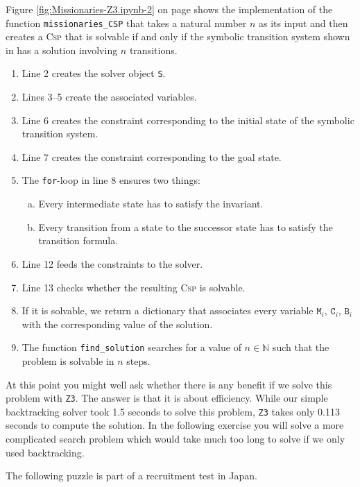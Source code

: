 Figure \ref{fig:Missionaries-Z3.ipynb-2} on page \pageref{fig:Missionaries-Z3.ipynb-2} shows the implementation
of the function \texttt{missionaries\_CSP} that takes a natural number $n$ as its input and then creates a
\textsc{Csp} that is solvable if and only if the symbolic transition system shown in
 has a solution involving $n$ transitions.
\begin{enumerate}
\item Line 2 creates the solver object \texttt{S}.
\item Lines 3--5 create the associated variables.
\item Line 6 creates the constraint corresponding to the initial state of the symbolic transition system.
\item Line 7 creates the constraint corresponding to the goal state.
\item The \texttt{for}-loop in line 8 ensures two things:
  \begin{enumerate}[(a)]
  \item Every intermediate state has to satisfy the invariant.
  \item Every transition from a state to the successor state has to satisfy the transition formula.
  \end{enumerate}
\item Line 12 feeds the constraints to the solver.
\item Line 13 checks whether the resulting \textsc{Csp} is solvable.
\item If it is solvable, we return a dictionary that associates every variable $\texttt{M}_i$,  $\texttt{C}_i$,
      $\texttt{B}_i$ with the corresponding value of the solution.
\item The function \texttt{find\_solution} searches for a value of $n \in \mathbb{N}$ such that the problem is
      solvable in $n$ steps.
\end{enumerate}
At this point you might well ask whether there is any benefit if we solve this problem with \texttt{Z3}.  The
answer is that it is about efficiency.  While our simple backtracking solver took 1.5 seconds to solve this
problem, \texttt{Z3} takes only 0.113 seconds to compute the solution.  In the following exercise you will
solve a more complicated search problem which would take much too long to solve if we only used backtracking.
\pagebreak
\vspace*{\fill}

\pagebreak

\exerciseEng
The following puzzle is part of a recruitment test in Japan.

